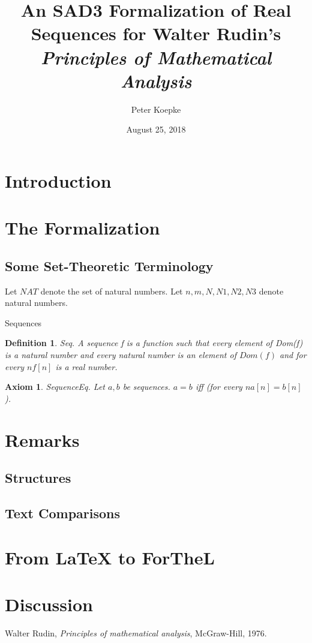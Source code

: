 \documentclass{article}
\newenvironment{forthel}{\begin{leftbar}}{\end{leftbar}}
\newtheorem{axiom}{Axiom}
\newtheorem{definition}{Definition}
\begin{document}
\title{An SAD3 Formalization of Real Sequences for Walter Rudin's
\it{Principles of Mathematical Analysis}}

\author{Peter Koepke}

\date{August 25, 2018}

\maketitle


\section{Introduction}


\section{The Formalization}
\subsection{Some Set-Theoretic Terminology}


\begin{forthel}
	
	Let $NAT$ denote the set of natural numbers.
	Let $n, m, N, N1, N2, N3$ denote natural numbers.
	
	Sequences
	
	\begin{definition} Seq.
	A sequence f is a function such that every element of Dom(f) is a natural number and every
	natural number is an element of $Dom(f)$ and for every $n f[n]$ is a real number.
	\end{definition}
	
	\begin{axiom} SequenceEq.
	Let $a, b$ be sequences. $a = b$ iff (for every $n a[n] = b[n]$).
	\end{axiom}
	
\end{forthel}

\section{Remarks}
\subsection{Structures}


\subsection{Text Comparisons}



\section{{From \LaTeX} to ForTheL}



\section{Discussion}


\begin{thebibliography}{1}

  Walter Rudin,
  \textit{Principles of mathematical analysis},
  McGraw-Hill,
  1976.

\end{thebibliography}
  
\end{document}
